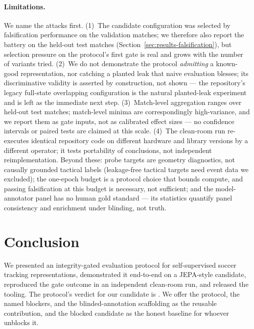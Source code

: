 \documentclass{article}
\begin{document}
\paragraph{Limitations.}
We name the attacks first. (1)~The candidate configuration was selected by
falsification performance on the validation matches; we therefore also report
the battery on the held-out test matches
(Section~\ref{sec:results-falsification}), but selection pressure on the
protocol's first gate is real and grows with the number of variants tried.
(2)~We do not demonstrate the protocol \emph{admitting} a known-good
representation, nor catching a planted leak that naive evaluation blesses;
its discriminative validity is asserted by construction, not shown --- the
repository's legacy full-state overlapping configuration is the natural
planted-leak experiment and is left as the immediate next step. (3)~Match-level
aggregation ranges over \NumTestMatches{} held-out test matches; match-level
minima are correspondingly high-variance, and we report them as gate inputs,
not as calibrated effect sizes --- no confidence intervals or paired tests are
claimed at this scale. (4)~The clean-room run re-executes identical repository
code on different hardware and library versions by a different operator; it
tests portability of conclusions, not independent reimplementation. Beyond
these: probe targets are geometry diagnostics, not causally grounded tactical
labels (leakage-free tactical targets need event data we excluded); the
one-epoch budget is a protocol choice that bounds compute, and passing
falsification at this budget is necessary, not sufficient; and the
model-annotator panel has no human gold standard --- its statistics quantify
panel consistency and enrichment under blinding, not truth.

\section{Conclusion}
\label{sec:conclusion}

We presented an integrity-gated evaluation protocol for self-supervised soccer
tracking representations, demonstrated it end-to-end on a JEPA-style
candidate, reproduced the gate outcome in an independent clean-room run, and
released the tooling. The protocol's verdict for our candidate is
\emph{\GateOverallStatus}. We offer the protocol, the named blockers, and the
blinded-annotation scaffolding as the reusable contribution, and the blocked
candidate as the honest baseline for whoever unblocks it.
\end{document}
